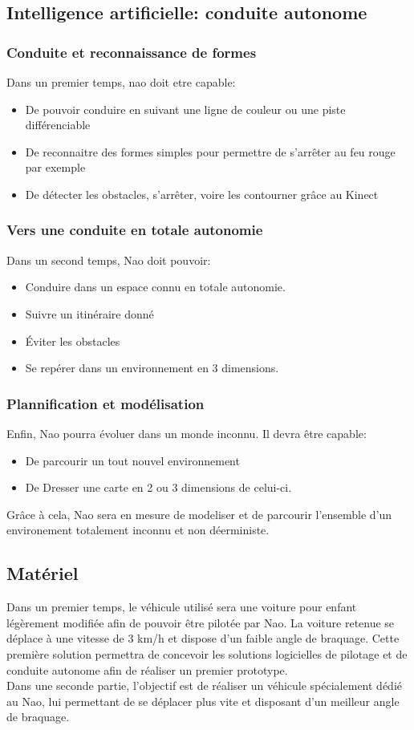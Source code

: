 \documentclass[11pt]{report} %
\begin{document}
		\subsection{Intelligence artificielle: conduite autonome}
			\subsubsection{Conduite et reconnaissance de formes}
				Dans un premier temps, nao doit etre capable:
				\begin{itemize}
				\item De pouvoir conduire en suivant une ligne de couleur ou une piste différenciable
				\item De reconnaitre des formes simples pour permettre de s'arrêter au feu rouge par exemple
				\item De détecter les obstacles, s'arrêter, voire les contourner grâce au Kinect
				\end{itemize}
			\subsubsection{Vers une conduite en totale autonomie}
				Dans un second temps, Nao doit pouvoir:
				\begin{itemize}
			  	\item Conduire dans un espace connu en totale autonomie.
				\item Suivre un itinéraire donné
				\item Éviter les obstacles
				\item Se repérer dans un environnement en 3 dimensions.
				\end{itemize}
			\subsubsection{Plannification et modélisation}
				Enfin, Nao pourra évoluer dans un monde inconnu. Il devra être capable:
				\begin{itemize}
				\item De parcourir un tout nouvel environnement
				\item De Dresser une carte en 2 ou 3 dimensions de celui-ci.
				\end{itemize}
				Grâce à cela, Nao sera en mesure de modeliser et de parcourir l'ensemble d'un environement totalement inconnu et non déerministe.
		\subsection{Matériel}
			Dans un premier temps, le véhicule utilisé sera une voiture pour enfant légèrement modifiée afin de pouvoir être pilotée par Nao. La voiture retenue se déplace à une vitesse de 3 km/h et dispose d'un faible angle de braquage. Cette première solution permettra de concevoir les solutions logicielles de pilotage et de conduite autonome afin de réaliser un premier prototype.\\
			Dans une seconde partie, l'objectif est de réaliser un véhicule spécialement dédié au Nao, lui permettant de se déplacer plus vite et disposant d'un meilleur angle de braquage.
\end{document}
